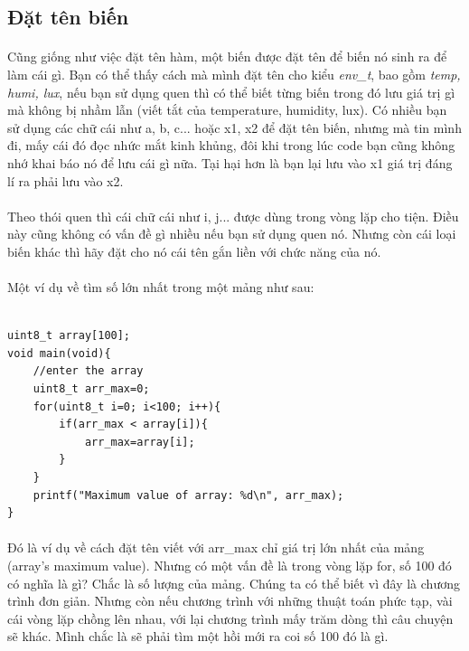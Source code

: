 \documentclass[12pt,a5paper]{book}
\begin{document}
\subsection{Đặt tên biến}
\paragraph{}
Cũng giống như việc đặt tên hàm, một biến được đặt tên để biến nó sinh ra để làm cái gì. Bạn có thể thấy cách mà mình đặt tên cho kiểu \textit{env\_t}, bao gồm \textit{temp, humi, lux}, nếu bạn sử dụng quen thì có thể biết từng biến trong đó lưu giá trị gì mà không bị nhầm lẫn (viết tắt của temperature, humidity, lux). Có nhiều bạn sử dụng các chữ cái như a, b, c... hoặc x1, x2 để đặt tên biến, nhưng mà tin mình đi, mấy cái đó đọc nhức mắt kinh khủng, đôi khi trong lúc code bạn cũng không nhớ khai báo nó để lưu cái gì nữa. Tại hại hơn là bạn lại lưu vào x1 giá trị đáng lí ra phải lưu vào x2.
\paragraph{}
Theo thói quen thì cái chữ cái như i, j... được dùng trong vòng lặp cho tiện. Điều này cũng không có vấn đề gì nhiều nếu bạn sử dụng quen nó. Nhưng còn cái loại biến khác thì hãy đặt cho nó cái tên gắn liền với chức năng của nó.
\paragraph{}
Một ví dụ về tìm số lớn nhất trong một mảng như sau:
\begin{lstlisting}

uint8_t array[100];
void main(void){
	//enter the array
	uint8_t arr_max=0;
	for(uint8_t i=0; i<100; i++){
		if(arr_max < array[i]){
			arr_max=array[i];
		}
	}
	printf("Maximum value of array: %d\n", arr_max);
}

\end{lstlisting}

\paragraph{}
Đó là ví dụ về cách đặt tên viết với arr\_max chỉ giá trị lớn nhất của mảng (array's maximum value). Nhưng có một vấn đề là trong vòng lặp for, số 100 đó có nghĩa là gì? Chắc là số lượng của mảng. Chúng ta có thể biết vì đây là chương trình đơn giản. Nhưng còn nếu chương trình với những thuật toán phức tạp, vài cái vòng lặp chồng lên nhau, với lại chương trình mấy trăm dòng thì câu chuyện sẽ khác. Mình chắc là sẽ phải tìm một hồi mới ra coi số 100 đó là gì.
\end{document}
